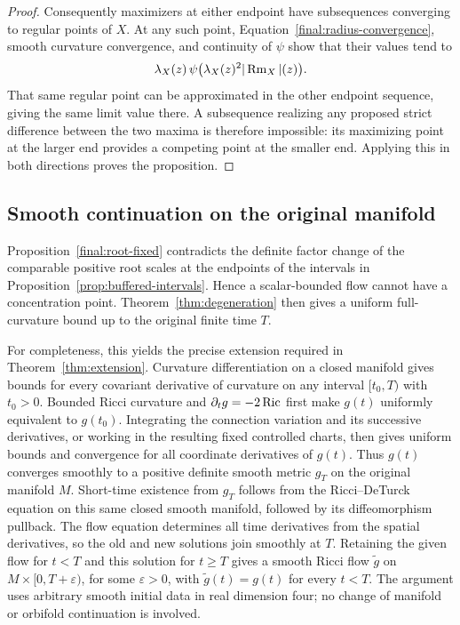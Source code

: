 \begin{proof}
Consequently maximizers at either endpoint have subsequences
converging to regular points of $X$.  At any such point,
Equation~\eqref{final:radius-convergence}, smooth curvature
convergence, and continuity of $\psi$ show that their values tend
to
\[
 \lambda_X(z)\,
       \psi\bigl(\lambda_X(z)^2|\operatorname{Rm}_X|(z)\bigr).
\]
That same regular point can be approximated in the other endpoint
sequence, giving the same limit value there.  A subsequence
realizing any proposed strict difference between the two maxima
is therefore impossible: its maximizing point at the larger end
provides a competing point at the smaller end.  Applying this in
both directions proves the proposition.
\end{proof}

\subsection{Smooth continuation on the original manifold}

Proposition~\ref{final:root-fixed} contradicts the definite factor
change of the comparable positive root scales at the endpoints
of the intervals in Proposition~\ref{prop:buffered-intervals}.
Hence a scalar-bounded flow cannot have a concentration point.
Theorem~\ref{thm:degeneration} then gives a uniform full-curvature
bound up to the original finite time $T$.

For completeness, this yields the precise extension required in
Theorem~\ref{thm:extension}.  Curvature differentiation on a closed
manifold gives bounds for every covariant derivative of curvature
on any interval $[t_0,T)$ with $t_0>0$.  Bounded Ricci curvature and
$\partial_tg=-2\operatorname{Ric}$ first make $g(t)$ uniformly equivalent to
$g(t_0)$.  Integrating the connection variation and its successive
derivatives, or working in the resulting fixed controlled charts,
then gives uniform bounds and convergence for all coordinate
derivatives of $g(t)$.  Thus $g(t)$ converges smoothly to a positive
definite smooth metric $g_T$ on the original manifold $M$.
Short-time existence from $g_T$ follows from the Ricci--DeTurck
equation on this same closed smooth manifold, followed by its
diffeomorphism pullback.  The flow equation determines all time
derivatives from the spatial derivatives, so the old and new
solutions join smoothly at $T$.  Retaining the given flow for
$t<T$ and this solution for $t\ge T$ gives a smooth Ricci flow
$\widetilde g$ on $M\times[0,T+\varepsilon)$, for some
$\varepsilon>0$, with $\widetilde g(t)=g(t)$ for every $t<T$.
The argument uses arbitrary smooth initial data in real dimension
four; no change of manifold or orbifold continuation is involved.
